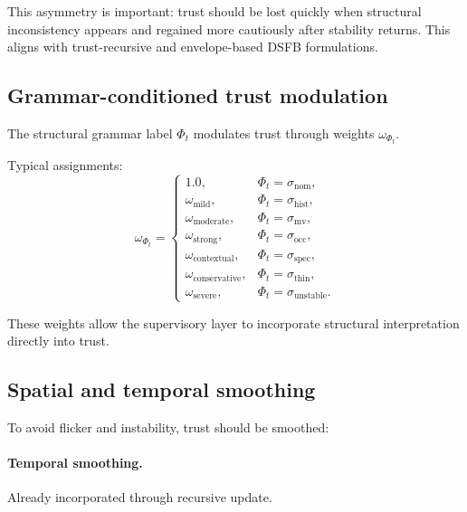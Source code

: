 \documentclass[11pt]{article}
\theoremstyle{definition}
\theoremstyle{plain}
\begin{document}
This asymmetry is important: trust should be lost quickly when structural inconsistency appears and regained more cautiously after stability returns. This aligns with trust-recursive and envelope-based DSFB formulations. 


\subsection{Grammar-conditioned trust modulation}

The structural grammar label $\Phi_t$ modulates trust through weights $\omega_{\Phi_t}$.

Typical assignments:
\begin{equation}
\omega_{\Phi_t}=
\begin{cases}
1.0, & \Phi_t=\sigma_{\mathrm{nom}},\\
\omega_{\mathrm{mild}}, & \Phi_t=\sigma_{\mathrm{hist}},\\
\omega_{\mathrm{moderate}}, & \Phi_t=\sigma_{\mathrm{mv}},\\
\omega_{\mathrm{strong}}, & \Phi_t=\sigma_{\mathrm{occ}},\\
\omega_{\mathrm{contextual}}, & \Phi_t=\sigma_{\mathrm{spec}},\\
\omega_{\mathrm{conservative}}, & \Phi_t=\sigma_{\mathrm{thin}},\\
\omega_{\mathrm{severe}}, & \Phi_t=\sigma_{\mathrm{unstable}}.
\end{cases}
\end{equation}

These weights allow the supervisory layer to incorporate structural interpretation directly into trust.


\subsection{Spatial and temporal smoothing}

To avoid flicker and instability, trust should be smoothed:

\paragraph{Temporal smoothing.}
Already incorporated through recursive update.
\end{document}
